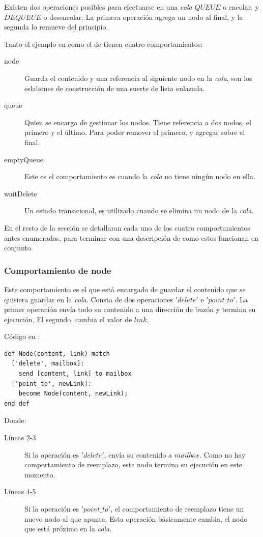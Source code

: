 Existen dos operaciones posibles para efectuarse en una \textit{cola} $QUEUE$ o encolar, y $DEQUEUE$ o desencolar. La primera operación agrega un nodo al final, y la segunda lo remueve del principio. 

Tanto el ejemplo en \SAL como el de \CSP tienen cuatro comportamientos:

\begin{description}
 \item [node] Guarda el contenido y una referencia al siguiente nodo en la \textit{cola}, son los eslabones de construcción de una suerte de lista enlazada.
 \item [queue] Quien se encarga de gestionar los nodos. Tiene referencia a dos nodos, el primero y el último. Para poder remover el primero, y agregar sobre el final.
 \item [emptyQueue] Este es el comportamiento es cuando la \textit{cola} no tiene ningún nodo en ella.
 \item [waitDelete] Un estado transicional, es utilizado cuando se elimina un nodo de la \textit{cola}.
\end{description}

En el resto de la sección se detallaran cada uno de los cuatro comportamientos antes enumerados, para terminar con una descripción de como estos funcionan en conjunto.

\subsubsection*{Comportamiento de node}
Este comportamiento es el que está encargado de guardar el contenido que se quisiera guardar en la \textit{cola}. Consta de dos operaciones $'delete'$ e $'point\_to'$. La primer operación envía todo su contenido a una dirección de buzón y termina su ejecución. El segundo, cambia el valor de $link$.

Código en \SAL:

\begin{lstlisting}[language=sal, style=simple]
def Node(content, link) match
  ['delete', mailbox]:
    send [content, link] to mailbox
  ['point_to', newLink]:
    become Node(content, newLink);
end def
\end{lstlisting}

Donde:

\begin{description}
 \item [Líneas 2-3] Si la operación es $'delete'$, envía su contenido a $mailbox$. Como no hay comportamiento de reemplazo, este nodo termina su ejecución en este momento.
 \item [Líneas 4-5] Si la operación es $'point\_to'$, el comportamiento de reemplazo tiene un nuevo nodo al que apunta. Esta operación básicamente cambia, el nodo que está próximo en la \textit{cola}.
\end{description}

